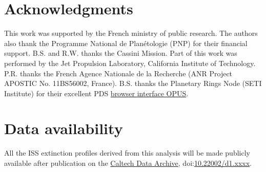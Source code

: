 \section*{Acknowledgments}

This work was supported by the French ministry of public research. The authors also thank the Programme National de Plan\'{e}tologie (PNP) for their financial support.
B.S. and R.W. thanks the Cassini Mission. Part of this work was performed by the Jet Propulsion Laboratory, California Institute of Technology.
P.R. thanks the French Agence Nationale de la Recherche (ANR Project APOSTIC No. 11BS56002, France).
B.S. thanks the Planetary Rings Node (SETI Institute) for their excellent PDS \href{https://tools.pds-rings.seti.org/opus}{browser interface OPUS}.

\section*{Data availability}
All the ISS extinction profiles derived from this analysis will be made publicly available after publication
on the \href{https://data.caltech.edu}{Caltech Data Archive}, doi:\href{https://doi.org/10.22002/d1.xxxx}{10.22002/d1.xxxx}.